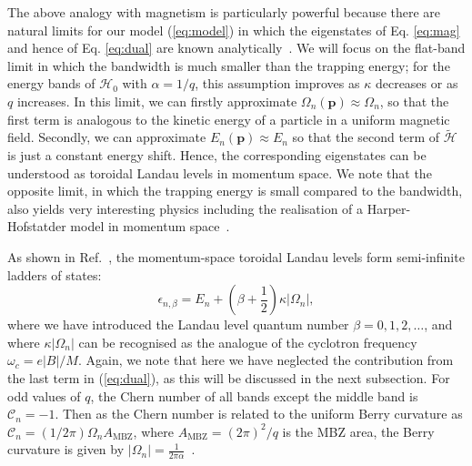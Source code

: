 \documentclass[twocolumn, 10pt, aps, superscriptaddress, floatfix, showpacs, pra, citeautoscript]{revtex4-1}
\newcommand{\vt}[1]{\mathbf{#1}}
\begin{document}
The above analogy with magnetism is particularly powerful because there are natural limits for our model (\ref{eq:model}) in which the eigenstates of Eq. \ref{eq:mag} and hence of Eq. \ref{eq:dual} are known analytically~\cite{price2014magnetic, ozawa2014momhh, Claassen_prl_2015}. We will focus on the flat-band limit in which the bandwidth is much smaller than the trapping energy; for the energy bands of $\mathcal{H}_0$ with $\alpha = 1/q$, this assumption improves as $\kappa$ decreases or as $q$ increases. In this limit, we can firstly approximate $\Omega_{n}(\mathbf{p}) \approx \Omega_n$, so that the first term is analogous to the kinetic energy of a particle in a uniform magnetic field. Secondly, we can approximate
$E_n(\vt{p}) \approx E_n$ so that the second term of $\widetilde{\mathcal{H}}$ is just a constant energy shift. Hence, the corresponding eigenstates can be understood as toroidal Landau levels in momentum space. We note that the opposite limit, in which the trapping energy is small compared to the bandwidth, also yields very interesting physics including the realisation of a Harper-Hofstatder model in momentum space~\cite{ozawa2014momhh, scaffidi2014exact}. 

As shown in Ref.~\cite{price2014magnetic}, the momentum-space toroidal Landau levels form semi-infinite ladders of states:
%
\begin{equation}\label{eq:ladders}
  \epsilon_{n,\beta} = E_n  + \left(\beta + \frac{1}{2}\right) \kappa |\Omega_n|  ,
\end{equation}
where we have introduced the Landau level quantum number
$\beta = 0,1,2,\dots$, and where $\kappa |\Omega_n|$ can be recognised as the analogue of the cyclotron frequency
$\omega_c = e |B| /M $. Again, we note that here we have neglected the contribution from the last term in (\ref{eq:dual}), as this will be discussed in the next subsection. For odd values of $q$, the Chern number of all bands except the middle band is $\mathcal{C}_n = -1$. Then as the Chern number is related to the uniform Berry curvature as $\mathcal{C}_n = (1/2\pi) \Omega_n A_{\text{MBZ}}$, where $A_{\text{MBZ}} = (2\pi)^2/q$ is the MBZ area, the Berry curvature is given by $|\Omega_n| = \frac{1}{2\pi\alpha}$~\cite{price2014magnetic}.  
\end{document}
